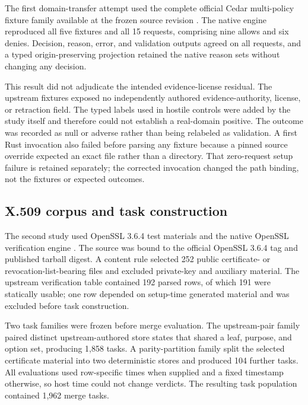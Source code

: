 \documentclass[pdflatex,sn-mathphys-num]{sn-jnl}
\begin{document}
The first domain-transfer attempt used the complete official Cedar multi-policy fixture family available at the frozen source revision \citep{cutler2024}. The native engine reproduced all five fixtures and all 15 requests, comprising nine allows and six denies. Decision, reason, error, and validation outputs agreed on all requests, and a typed origin-preserving projection retained the native reason sets without changing any decision.

This result did not adjudicate the intended evidence-license residual. The upstream fixtures exposed no independently authored evidence-authority, license, or retraction field. The typed labels used in hostile controls were added by the study itself and therefore could not establish a real-domain positive. The outcome was recorded as null or adverse rather than being relabeled as validation. A first Rust invocation also failed before parsing any fixture because a pinned source override expected an exact file rather than a directory. That zero-request setup failure is retained separately; the corrected invocation changed the path binding, not the fixtures or expected outcomes.

\subsection{X.509 corpus and task construction}\label{x.509-corpus-and-task-construction}

The second study used OpenSSL 3.6.4 test materials and the native OpenSSL verification engine \citep{openssl364, rfc5280}. The source was bound to the official OpenSSL 3.6.4 tag and published tarball digest. A content rule selected 252 public certificate- or revocation-list-bearing files and excluded private-key and auxiliary material. The upstream verification table contained 192 parsed rows, of which 191 were statically usable; one row depended on setup-time generated material and was excluded before task construction.

Two task families were frozen before merge evaluation. The upstream-pair family paired distinct upstream-authored store states that shared a leaf, purpose, and option set, producing 1,858 tasks. A parity-partition family split the selected certificate material into two deterministic stores and produced 104 further tasks. All evaluations used row-specific times when supplied and a fixed timestamp otherwise, so host time could not change verdicts. The resulting task population contained 1,962 merge tasks.
\end{document}
